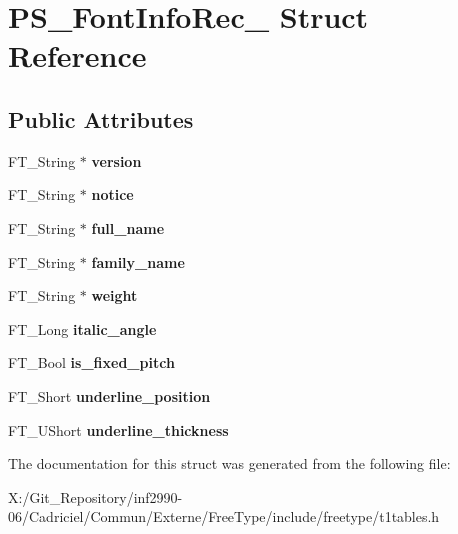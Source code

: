 \hypertarget{struct_p_s___font_info_rec__}{\section{P\-S\-\_\-\-Font\-Info\-Rec\-\_\- Struct Reference}
\label{struct_p_s___font_info_rec__}
}
\subsection*{Public Attributes}
\begin{DoxyCompactItemize}
\item 
\hypertarget{struct_p_s___font_info_rec___adb595076e50f8e7ece9446f612433cfc}{F\-T\-\_\-\-String $\ast$ {\bfseries version}}\label{struct_p_s___font_info_rec___adb595076e50f8e7ece9446f612433cfc}

\item 
\hypertarget{struct_p_s___font_info_rec___a63858ebce653f21d9aa2ddc61ee32b80}{F\-T\-\_\-\-String $\ast$ {\bfseries notice}}\label{struct_p_s___font_info_rec___a63858ebce653f21d9aa2ddc61ee32b80}

\item 
\hypertarget{struct_p_s___font_info_rec___a039dbf76ccc1b63b03e77215cb4b430b}{F\-T\-\_\-\-String $\ast$ {\bfseries full\-\_\-name}}\label{struct_p_s___font_info_rec___a039dbf76ccc1b63b03e77215cb4b430b}

\item 
\hypertarget{struct_p_s___font_info_rec___ac54d883f153a495f9a20dc043ed434cf}{F\-T\-\_\-\-String $\ast$ {\bfseries family\-\_\-name}}\label{struct_p_s___font_info_rec___ac54d883f153a495f9a20dc043ed434cf}

\item 
\hypertarget{struct_p_s___font_info_rec___a057243ec7cf62f573fa675ccb728f4b1}{F\-T\-\_\-\-String $\ast$ {\bfseries weight}}\label{struct_p_s___font_info_rec___a057243ec7cf62f573fa675ccb728f4b1}

\item 
\hypertarget{struct_p_s___font_info_rec___ab558a75a56fadd54dfc71dcbeec1375a}{F\-T\-\_\-\-Long {\bfseries italic\-\_\-angle}}\label{struct_p_s___font_info_rec___ab558a75a56fadd54dfc71dcbeec1375a}

\item 
\hypertarget{struct_p_s___font_info_rec___a68e2d0913fe910ea86d558a4a426412a}{F\-T\-\_\-\-Bool {\bfseries is\-\_\-fixed\-\_\-pitch}}\label{struct_p_s___font_info_rec___a68e2d0913fe910ea86d558a4a426412a}

\item 
\hypertarget{struct_p_s___font_info_rec___a772af52d17288d7846e8893e74d55212}{F\-T\-\_\-\-Short {\bfseries underline\-\_\-position}}\label{struct_p_s___font_info_rec___a772af52d17288d7846e8893e74d55212}

\item 
\hypertarget{struct_p_s___font_info_rec___a423904e811db5195485557bf0dccf126}{F\-T\-\_\-\-U\-Short {\bfseries underline\-\_\-thickness}}\label{struct_p_s___font_info_rec___a423904e811db5195485557bf0dccf126}

\end{DoxyCompactItemize}


The documentation for this struct was generated from the following file\-:\begin{DoxyCompactItemize}
\item 
X\-:/\-Git\-\_\-\-Repository/inf2990-\/06/\-Cadriciel/\-Commun/\-Externe/\-Free\-Type/include/freetype/t1tables.\-h\end{DoxyCompactItemize}
